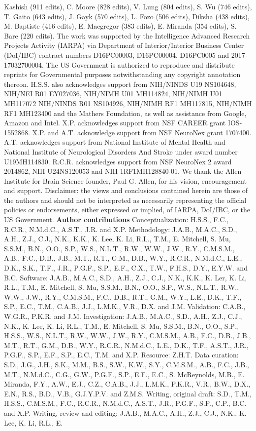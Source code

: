\documentclass{article}
\begin{document}
Kashish (911 edits), C. Moore (828 edits), V. Lung (804 edits), S. Wu (746 edits), T. Gaito (643 edits), J. Gayk (570 edits), L. Fozo (506 edits), Diksha (438 edits), M. Baptiste (416 edits), E. Macgregor (383 edits), E. Miranda (354 edits), S. Bare (220 edits). The work was supported by the Intelligence Advanced Research Projects Activity (IARPA) via Department of Interior/Interior Business Center (DoI/IBC) contract numbers D16PC00003, D16PC00004, D16PC0005 and 2017-17032700004. The US Government is authorized to reproduce and distribute reprints for Governmental purposes notwithstanding any copyright annotation thereon. H.S.S. also acknowledges support from NIH/NINDS U19 NS104648, NIH/NEI R01 EY027036, NIH/NIMH U01 MH114824, NIH/NIMH U01 MH117072 NIH/NINDS R01 NS104926, NIH/NIMH RF1 MH117815, NIH/NIMH RF1 MH123400 and the Mathers Foundation, as well as assistance from Google, Amazon and Intel. X.P. acknowledges support from NSF CAREER grant IOS-1552868. X.P. and A.T. acknowledge support from NSF NeuroNex grant 1707400. A.T. acknowledges support from National Institute of Mental Health and National Institute of Neurological Disorders And Stroke under award number U19MH114830. R.C.R. acknowledges support from NSF NeuroNex 2 award 2014862, NIH U24NS120053 and NIH 1RF1MH128840-01. We thank the Allen Institute for Brain Science founder, Paul G. Allen, for his vision, encouragement and support. Disclaimer: the views and conclusions contained herein are those of the authors and should not be interpreted as necessarily representing the official policies or endorsements, either expressed or implied, of IARPA, DoI/IBC, or the US Government. \textbf{Author contributions }Conceptualization: H.S.S., F.C., R.C.R., N.M.d.C., A.S.T., J.R. and X.P. Methodology: J.A.B., M.A.C., S.D., A.H., Z.J., C.J., N.K., K.K., K. Lee, K. Li, R.L., T.M., E. Mitchell, S. Mu, S.S.M., B.N., O.O., S.P., W.S., N.L.T., R.W., W.W., J.W., R.Y., C.M.S.M., A.B., F.C., D.B., J.B., M.T., R.T., G.M., D.B., W.Y., R.C.R., N.M.d.C., L.E., D.K., S.K., T.F., J.R., P.G.F., S.P., E.F., C.X., T.W., F.H.S., D.Y., E.Y.W. and B.C. Software: J.A.B., M.A.C., S.D., A.H., Z.J., C.J., N.K., K.K., K. Ler, K. Li, R.L., T.M., E. Mitchell, S. Mu, S.S.M., B.N., O.O., S.P., W.S., N.L.T., R.W., W.W., J.W., R.Y., C.M.S.M., F.C., D.B., R.T., G.M., W.Y., L.E., D.K., T.F., S.P., E.C., T.M., C.A.B., J.J., L.M.K., V.R., D.X. and J.M. Validation: C.A.B., W.G.R., P.K.R. and J.M. Investigation: J.A.B., M.A.C., S.D., A.H., Z.J., C.J., N.K., K. Lee, K. Li, R.L., T.M., E. Mitchell, S. Mu, S.S.M., B.N., O.O., S.P., H.S.S., W.S., N.L.T., R.W., W.W., J.W., R.Y., C.M.S.M., A.B., F.C., D.B., J.B., M.T., R.T., G.M., D.B., W.Y., R.C.R., N.M.d.C., L.E., D.K., T.F., A.S.T., J.R., P.G.F., S.P., E.F., S.P., E.C., T.M. and X.P. Resource: Z.H.T. Data curation: S.D., J.G., J.H., S.K., M.M., B.S., S.W., K.W., S.Y., C.M.S.M., A.B., F.C., J.B., M.T., N.M.d.C., C.G., G.W., P.G.F., S.P., E.F., E.C., S. McReynolds, M.B., E. Miranda, F.Y., A.W., E.J., C.Z., C.A.B., J.J., L.M.K., P.K.R., V.R., B.W., D.X., E.N., R.S., B.D., V.B., G.J.Y.P.V. and Z.M.S. Writing, original draft: S.D., T.M., H.S.S., C.M.S.M., F.C., R.C.R., N.M.d.C., A.S.T., J.R., P.G.F., S.P., C.P., B.C. and X.P. Writing, review and editing: J.A.B., M.A.C., A.H., Z.J., C.J., N.K., K. Lee, K. Li, R.L., E. 
\end{document}
